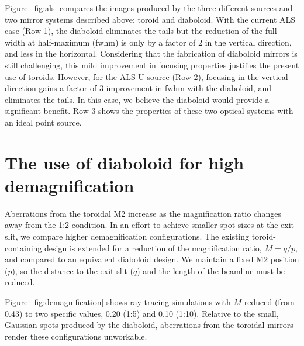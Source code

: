 \documentclass{iucr}       %
\begin{document}
Figure~\ref{fig:als} compares the images produced by the three different sources and two mirror systems described above: toroid and diaboloid. With the current ALS case (Row 1), the diaboloid eliminates the tails but the reduction of the full width at half-maximum (fwhm) is only by a factor of 2 in the vertical direction, and less in the horizontal. Considering that the fabrication of diaboloid mirrors is still challenging, this mild improvement in focusing properties justifies the present use of toroids. However, for the ALS-U source (Row 2), focusing in the vertical direction gains a factor of 3 improvement in fwhm with the diaboloid, and eliminates the tails. In this case, we believe the diaboloid would provide a significant benefit. Row 3 shows the properties of these two optical systems with an ideal point source.

\section{The use of diaboloid for high demagnification}
\label{sec:scan}

Aberrations from the toroidal M2 increase as the magnification ratio changes away from the 1:2 condition. In an effort to achieve smaller spot sizes at the exit slit, we compare higher demagnification configurations. The existing toroid-containing design is extended for a reduction of the magnification ratio, $M=q/p$, and compared to an equivalent diaboloid design. We maintain a fixed M2 position ($p$), so the distance to the exit slit ($q$) and the length of the beamline must be reduced.

Figure~\ref{fig:demagnification} shows ray tracing simulations with $M$ reduced (from 0.43) to two specific values, 0.20 (1:5) and 0.10 (1:10). Relative to the small, Gaussian spots produced by the diaboloid, aberrations from the toroidal mirrors render these configurations unworkable.
\end{document}
